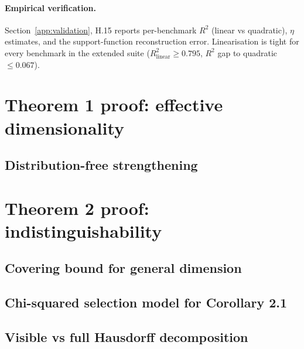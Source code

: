 \documentclass{article}
\begin{document}
\paragraph{Empirical verification.} Section~\ref{app:validation}, H.15
reports per-benchmark $R^2$ (linear vs quadratic), $\eta$ estimates,
and the support-function reconstruction error. Linearisation is tight
for every benchmark in the extended suite ($R^2_{\mathrm{linear}} \ge
0.795$, $R^2$ gap to quadratic $\le 0.067$).

\section{Theorem 1 proof: effective dimensionality}
\label{app:proof1}


\subsection*{Distribution-free strengthening}


\section{Theorem 2 proof: indistinguishability}
\label{app:proof2}


\subsection*{Covering bound for general dimension}


\subsection*{Chi-squared selection model for Corollary 2.1}


\subsection*{Visible vs full Hausdorff decomposition}
\end{document}
